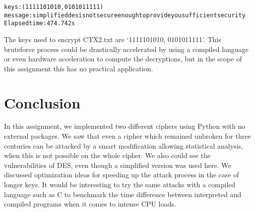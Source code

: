 \documentclass{article}
\begin{document}
\begin{alltt}
    keys : (1111101010, 0101011111) 
    message : simplifieddesisnotsecureenoughtoprovideyousufficientsecurity
    Elapsed time : 474.742s    
\end{alltt}

The keys used to encrypt CTX2.txt are `1111101010, 0101011111'. This bruteforce process could be drastically accelerated by using a compiled language or even hardware acceleration to compute the decryptions, but in the scope of this assignment this has no practical application.

\section{Conclusion}

In this assignment, we implemented two different ciphers using Python with no external packages. We saw that even a cipher which remained unbroken for three centuries can be attacked by a smart modification allowing statistical analysis, when this is not possible on the whole cipher. We also could see the vulnerabilities of DES, even though a simplified version was used here. We discussed optimization ideas for speeding up the attack process in the case of longer keys. 
It would be interesting to try the same attacks with a compiled language such as C to benchmark the time difference between interpreted and compiled programs when it comes to intense CPU loads.





\end{document}
